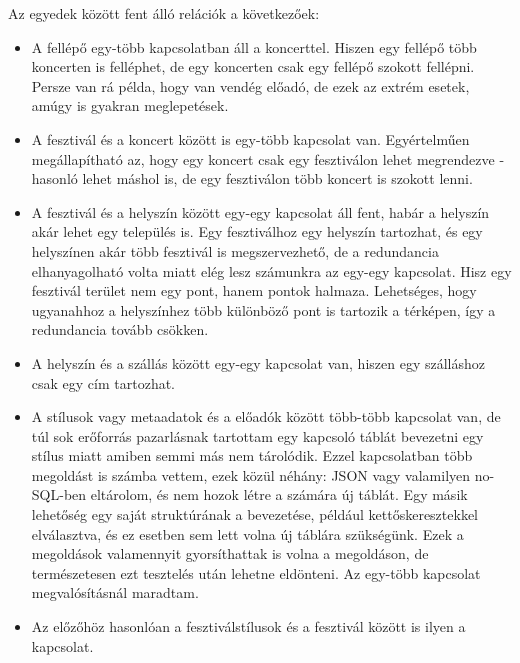 \documentclass[11pt]{article}
\begin{document}
Az egyedek között fent álló relációk a következőek:
\begin{itemize}
\item A fellépő egy-több kapcsolatban áll a koncerttel. Hiszen egy fellépő több koncerten is felléphet, de egy koncerten csak egy fellépő szokott fellépni. Persze van rá példa, hogy van vendég előadó, de ezek az extrém esetek, amúgy is gyakran meglepetések.
\item A fesztivál és a koncert között is egy-több kapcsolat van. Egyértelműen megállapítható az, hogy egy koncert csak egy fesztiválon lehet megrendezve - hasonló lehet máshol is, de egy fesztiválon több koncert is szokott lenni.
\item A fesztivál és a helyszín között egy-egy kapcsolat áll fent, habár a helyszín akár lehet egy település is. Egy fesztiválhoz egy helyszín tartozhat, és egy helyszínen akár több fesztivál is megszervezhető, de a redundancia elhanyagolható volta miatt elég lesz számunkra az egy-egy kapcsolat. Hisz egy fesztivál terület nem egy pont, hanem pontok halmaza. Lehetséges, hogy ugyanahhoz a helyszínhez több különböző pont is tartozik a térképen, így a redundancia tovább csökken.
\item  A helyszín és a szállás között egy-egy kapcsolat van, hiszen egy szálláshoz csak egy cím tartozhat.
\item A stílusok vagy metaadatok és a előadók között több-több kapcsolat van, de túl sok erőforrás pazarlásnak tartottam egy kapcsoló táblát bevezetni egy stílus miatt amiben semmi más nem tárolódik. Ezzel kapcsolatban több megoldást is számba vettem, ezek közül néhány: JSON vagy valamilyen no-SQL-ben eltárolom, és nem hozok létre a számára új táblát. Egy másik lehetőség egy saját struktúrának a bevezetése, például kettőskeresztekkel elválasztva, és ez esetben sem lett volna új táblára szükségünk. Ezek a megoldások valamennyit gyorsíthattak is volna a megoldáson, de természetesen ezt tesztelés után lehetne eldönteni. Az egy-több kapcsolat megvalósításnál maradtam.
\item Az előzőhöz hasonlóan a fesztiválstílusok és a fesztivál között is ilyen a kapcsolat.
\end{itemize}
\end{document}
